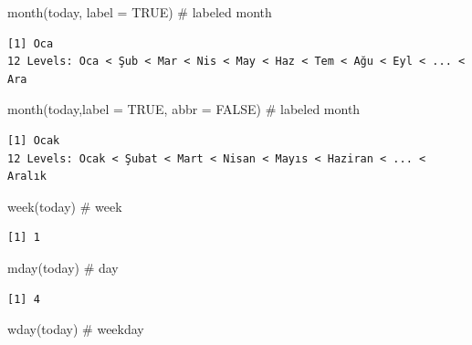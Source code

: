 \documentclass[
  letterpaper,
  DIV=11,
  numbers=noendperiod]{scrreprt}
\newenvironment{Shaded}{\begin{snugshade}}{\end{snugshade}}
\newcommand{\AttributeTok}[1]{\textcolor[rgb]{0.40,0.45,0.13}{#1}}
\newcommand{\CommentTok}[1]{\textcolor[rgb]{0.37,0.37,0.37}{#1}}
\newcommand{\ConstantTok}[1]{\textcolor[rgb]{0.56,0.35,0.01}{#1}}
\newcommand{\FunctionTok}[1]{\textcolor[rgb]{0.28,0.35,0.67}{#1}}
\newcommand{\NormalTok}[1]{\textcolor[rgb]{0.00,0.23,0.31}{#1}}
\begin{document}
\begin{Shaded}
\begin{Highlighting}[]
\FunctionTok{month}\NormalTok{(today, }\AttributeTok{label =} \ConstantTok{TRUE}\NormalTok{) }\CommentTok{\# labeled month}
\end{Highlighting}
\end{Shaded}

\begin{verbatim}
[1] Oca
12 Levels: Oca < Şub < Mar < Nis < May < Haz < Tem < Ağu < Eyl < ... < Ara
\end{verbatim}

\begin{Shaded}
\begin{Highlighting}[]
\FunctionTok{month}\NormalTok{(today,}\AttributeTok{label =} \ConstantTok{TRUE}\NormalTok{, }\AttributeTok{abbr =} \ConstantTok{FALSE}\NormalTok{) }\CommentTok{\# labeled month}
\end{Highlighting}
\end{Shaded}

\begin{verbatim}
[1] Ocak
12 Levels: Ocak < Şubat < Mart < Nisan < Mayıs < Haziran < ... < Aralık
\end{verbatim}

\begin{Shaded}
\begin{Highlighting}[]
\FunctionTok{week}\NormalTok{(today) }\CommentTok{\# week}
\end{Highlighting}
\end{Shaded}

\begin{verbatim}
[1] 1
\end{verbatim}

\begin{Shaded}
\begin{Highlighting}[]
\FunctionTok{mday}\NormalTok{(today) }\CommentTok{\# day}
\end{Highlighting}
\end{Shaded}

\begin{verbatim}
[1] 4
\end{verbatim}

\begin{Shaded}
\begin{Highlighting}[]
\FunctionTok{wday}\NormalTok{(today) }\CommentTok{\# weekday}
\end{Highlighting}
\end{Shaded}
\end{document}
